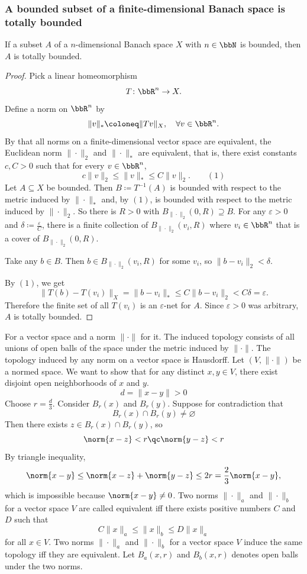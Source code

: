 \documentclass[a4paper,12pt]{article}
\begin{document}
\subsubsection{A bounded subset of a finite-dimensional Banach space is totally bounded}
If a subset $A$ of a $n$-dimensional Banach space $X$ with $n\in\bbN$ is bounded, then $A$ is totally bounded.
\begin{proof}
    Pick a linear homeomorphism
    \[T\colon\bbR^n\to X.\]
    Define a norm on $\bbR^n$ by
    \[\|v\|_*\coloneq\|Tv\|_X,\quad\forall v\in\bbR^n.\]
    By that all norms on a finite-dimensional vector space are equivalent, the Euclidean norm $\|\cdot\|_2$ and $\|\cdot\|_*$ are equivalent, that is, there exist constants $c,C>0$ such that for every $v\in \bbR^n$,
    \[c\|v\|_2\leq\|v\|_*\leq C\|v\|_2.\qquad (1)\]
    Let $A\subseteq X$ be bounded. Then $B\coloneq T^{-1}(A)$ is bounded with respect to the metric induced by $\|\cdot\|_*$ and, by $(1)$, is bounded with respect to the metric induced by $\|\cdot\|_2$. So there is $R>0$ with $B_{\|\cdot\|_2}(0,R)\supseteq B$.
    For any $\varepsilon>0$ and $\delta\coloneq\frac{\varepsilon}{C}$, there is a finite collection of $B_{\|\cdot\|_2}(v_i,R)$ where $v_i\in\bbR^n$ that is a cover of $B_{\|\cdot\|_2}(0,R)$.

    Take any $b\in B$. Then $b\in B_{\|\cdot\|_2}(v_i,R)$ for some $v_i$, so $\|b-v_i\|_2<\delta$.

    By $(1)$, we get
    \[\|T(b)-T(v_i)\|_X=\|b-v_i\|_*\leq C\|b-v_i\|_2<C\delta=\varepsilon.\]
    Therefore the finite set of all $T(v_i)$ is an $\varepsilon$-net for $A$. Since $\varepsilon>0$ was arbitrary, $A$ is totally bounded.
\end{proof}
For a vector space and a norm $\|\cdot\|$ for it. The induced topology consists of all unions of open balls of the space under the metric induced by $\|\cdot\|$.
The topology induced by any norm on a vector space is Hausdorff.
\bpr
Let \((V,\|\cdot\|)\) be a normed space. We want to show that for any distinct \(x,y\in V\), there exist disjoint open neighborhoods of \(x\) and \(y\).
\[d=\|x-y\|>0\]
Choose $r=\frac{d}{3}$. Consider $B_r(x)$ and $B_r(y)$. Suppose for contradiction that
\[B_r(x)\cap B_r(y)\ne\varnothing\]
Then there exists $z\in B_r(x)\cap B_r(y)$, so
\[\norm{x-z}<r\qc\norm{y-z}<r\]
By triangle inequality,
\[\norm{x-y}\le\norm{x-z}+\norm{y-z}\le 2r=\frac{2}{3}\norm{x-y},\]
which is impossible because $\norm{x-y}\ne 0$.
\epr
{}
Two norms $\|\cdot\|_a$ and $\|\cdot\|_b$ for a vector space $V$ are called equivalent iff there exists positive numbers $C$ and $D$ such that
\[C\|x\|_a\le\|x\|_b\le D\|x\|_a\]
for all $x\in V$.
Two norms $\|\cdot\|_a$ and $\|\cdot\|_b$ for a vector space $V$ induce the same topology iff they are equivalent.
\bpr
Let $B_a(x,r)$ and $B_b(x,r)$ denotes open balls under the two norms.
\end{document}
